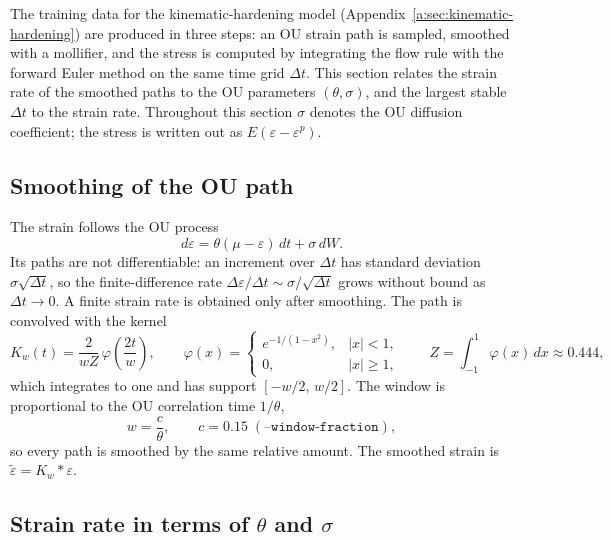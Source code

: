 \documentclass[11pt]{article}
\begin{document}
The training data for the kinematic-hardening model
(Appendix~\ref{a:sec:kinematic-hardening}) are produced in three steps:
an OU strain path is sampled, smoothed with a mollifier, and the stress is
computed by integrating the flow rule with the forward Euler method on the
same time grid $\Delta t$. This section relates the strain rate of the
smoothed paths to the OU parameters $(\theta,\sigma)$, and the largest stable
$\Delta t$ to the strain rate. Throughout this section $\sigma$ denotes the OU
diffusion coefficient; the stress is written out as
$E(\varepsilon-\varepsilon^p)$.

\subsection{Smoothing of the OU path}
The strain follows the OU process
\begin{equation}
    d\varepsilon = \theta(\mu-\varepsilon)\,dt + \sigma\,dW .
\end{equation}
Its paths are not differentiable: an increment over $\Delta t$ has standard
deviation $\sigma\sqrt{\Delta t}$, so the finite-difference rate
$\Delta\varepsilon/\Delta t\sim\sigma/\sqrt{\Delta t}$ grows without bound as
$\Delta t\to 0$. A finite strain rate is obtained only after smoothing. The
path is convolved with the kernel
\begin{equation}
    K_w(t) = \frac{2}{wZ}\,\varphi\!\left(\frac{2t}{w}\right),
    \qquad
    \varphi(x) =
    \begin{cases}
        e^{-1/(1-x^2)}, & |x|<1,     \\
        0,              & |x|\geq 1,
    \end{cases}
    \qquad
    Z=\int_{-1}^{1}\varphi(x)\,dx \approx 0.444,
\end{equation}
which integrates to one and has support $[-w/2,\,w/2]$. The window is
proportional to the OU correlation time $1/\theta$,
\begin{equation}
    w = \frac{c}{\theta}, \qquad c = 0.15 \;(\texttt{--window-fraction}),
\end{equation}
so every path is smoothed by the same relative amount. The smoothed strain is
$\tilde\varepsilon = K_w * \varepsilon$.

\subsection{Strain rate in terms of \texorpdfstring{$\theta$}{theta} and \texorpdfstring{$\sigma$}{sigma}}
\label{sec:strain-rate-ou}
\end{document}
